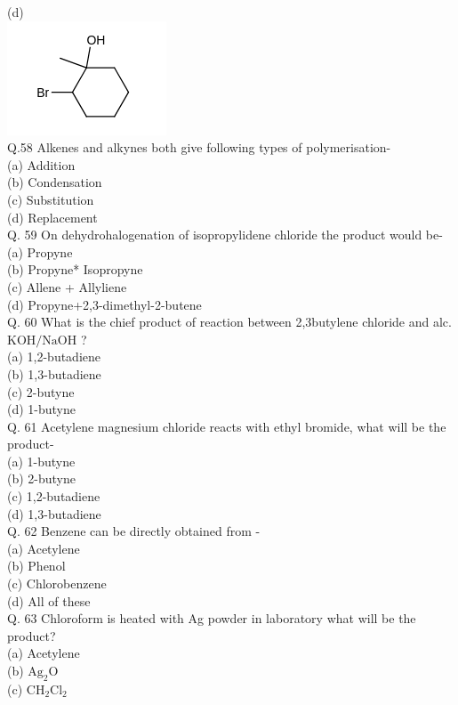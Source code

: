 \documentclass[10pt]{article}
\begin{document}
(d)\\
\includegraphics{smile-0ec7cf84257708315ab60397b001616629b83a39}\\
Q.58 Alkenes and alkynes both give following types of polymerisation-\\
(a) Addition\\
(b) Condensation\\
(c) Substitution\\
(d) Replacement\\
Q. 59 On dehydrohalogenation of isopropylidene chloride the product would be-\\
(a) Propyne\\
(b) Propyne* Isopropyne\\
(c) Allene + Allyliene\\
(d) Propyne+2,3-dimethyl-2-butene\\
Q. 60 What is the chief product of reaction between 2,3butylene chloride and alc. $\mathrm{KOH} / \mathrm{NaOH}$ ?\\
(a) 1,2-butadiene\\
(b) 1,3-butadiene\\
(c) 2-butyne\\
(d) 1-butyne\\
Q. 61 Acetylene magnesium chloride reacts with ethyl bromide, what will be the product-\\
(a) 1-butyne\\
(b) 2-butyne\\
(c) 1,2-butadiene\\
(d) 1,3-butadiene\\
Q. 62 Benzene can be directly obtained from -\\
(a) Acetylene\\
(b) Phenol\\
(c) Chlorobenzene\\
(d) All of these\\
Q. 63 Chloroform is heated with Ag powder in laboratory what will be the product?\\
(a) Acetylene\\
(b) $\mathrm{Ag}_{2} \mathrm{O}$\\
(c) $\mathrm{CH}_{2} \mathrm{Cl}_{2}$\\
\end{document}
